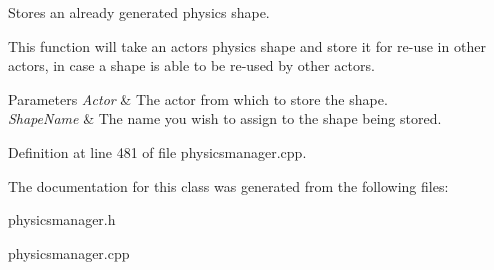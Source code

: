 Stores an already generated physics shape. 

This function will take an actors physics shape and store it for re-\/use in other actors, in case a shape is able to be re-\/used by other actors. 
\begin{DoxyParams}{Parameters}
{\em Actor} & The actor from which to store the shape. \\
\hline
{\em ShapeName} & The name you wish to assign to the shape being stored. \\
\hline
\end{DoxyParams}


Definition at line 481 of file physicsmanager.cpp.



The documentation for this class was generated from the following files:\begin{DoxyCompactItemize}
\item 
physicsmanager.h\item 
physicsmanager.cpp\end{DoxyCompactItemize}
